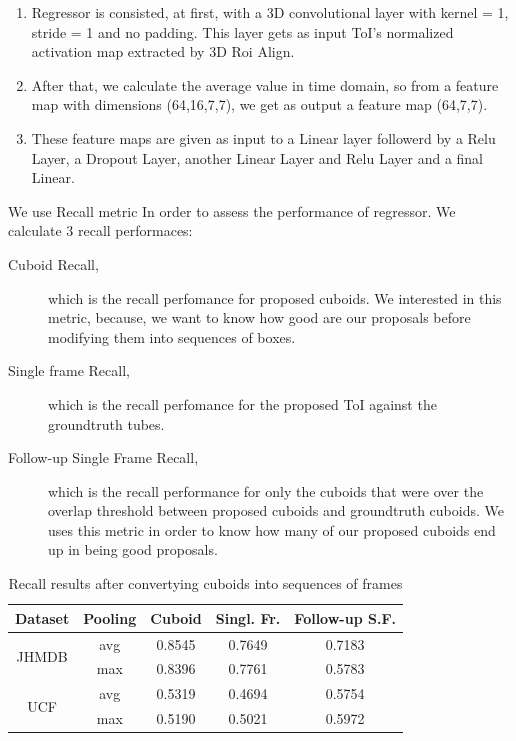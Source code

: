 \begin{enumerate}
\item Regressor is consisted, at first, with a 3D convolutional layer with kernel = 1, stride = 1 and no padding. This layer gets as input ToI's normalized activation map extracted by 3D Roi Align.
\item After that, we calculate the average value in time domain, so from a feature map with dimensions (64,16,7,7), we get as output a feature map (64,7,7).
\item These feature maps are given as input to a Linear layer followerd by a Relu Layer, a Dropout Layer, another Linear Layer and Relu Layer and a final Linear.
\end{enumerate}

We use Recall metric In order to assess the performance of regressor. We calculate 3 recall performaces:
\begin{description}
\item [Cuboid Recall,] which is the recall perfomance for proposed cuboids. We interested in this metric, because, we
  want to know how good are our proposals before modifying them into sequences of boxes.

\item [Single frame Recall,] which is the recall perfomance for the proposed ToI against the groundtruth tubes.
\item[Follow-up Single Frame Recall,] which is the recall performance for only the cuboids that were over the overlap threshold between
  proposed cuboids and groundtruth cuboids. We uses this metric in order to know how many of our proposed cuboids end up in being good proposals.
\end{description}

\begin{table}[h]
  \centering
  \begin{tabular} {||c | c || c | c | c ||}
    \hline
    \textbf{Dataset} & \textbf{Pooling} & \textbf{Cuboid} & \textbf{Singl. Fr. } &  \textbf{Follow-up S.F.}\\
    \hline                
    \multirow{2}{*}{JHMDB} & avg & 0.8545 & 0.7649 & 0.7183 \\
    \cline{2-5}
    {} & max & 0.8396 & 0.7761 & 0.5783 \\
    \cline{1-5}
    \multirow{2}{*}{UCF} & avg & 0.5319 & 0.4694 & 0.5754 \\
    \cline{2-5}
    {} & max & 0.5190 & 0.5021 & 0.5972 \\
    \cline{1-5}
                                   
  \end{tabular}
  \caption{Recall results after convertying cuboids into sequences of frames}
  \label{table:reg_1_1}
\end{table}

